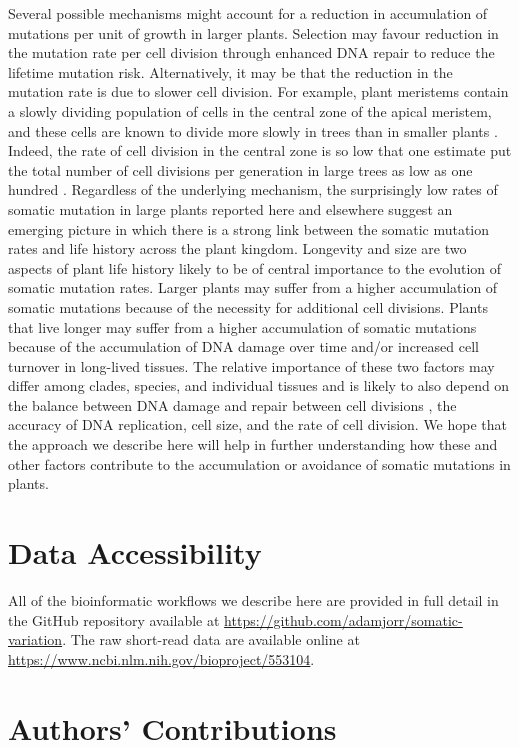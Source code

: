 Several possible mechanisms might account for a reduction in accumulation of mutations per unit of growth in larger plants. Selection may favour reduction in the mutation rate per cell division through enhanced DNA repair to reduce the lifetime mutation risk. Alternatively, it may be that the reduction in the mutation rate is due to slower cell division. For example, plant meristems contain a slowly dividing population of cells in the central zone of the apical meristem, and these cells are known to divide more slowly in trees than in smaller plants \parencite{romberger_plant_1993}. Indeed, the rate of cell division in the central zone is so low that one estimate put the total number of cell divisions per generation in large trees as low as one hundred \parencite{romberger_plant_1993}. Regardless of the underlying mechanism, the surprisingly low rates of somatic mutation in large plants reported here and elsewhere suggest an emerging picture in which there is a strong link between the somatic mutation rates and life history across the plant kingdom. Longevity and size are two aspects of plant life history likely to be of central importance to the evolution of somatic mutation rates. Larger plants may suffer from a higher accumulation of somatic mutations because of the necessity for additional cell divisions. Plants that live longer may suffer from a higher accumulation of somatic mutations because of the accumulation of DNA damage over time and/or increased cell turnover in long-lived tissues. The relative importance of these two factors may differ among clades, species, and individual tissues and is likely to also depend on the balance between DNA damage and repair between cell divisions \parencite{gao_interpreting_2016}, the accuracy of DNA replication, cell size, and the rate of cell division. We hope that the approach we describe here will help in further understanding how these and other factors contribute to the accumulation or avoidance of somatic mutations in plants.

\section{Data Accessibility}

All of the bioinformatic workflows we describe here are provided in full detail in the GitHub repository available at \url{https://github.com/adamjorr/somatic-variation}. The raw short-read data are available online at \url{https://www.ncbi.nlm.nih.gov/bioproject/553104}.

\section{Authors' Contributions}


